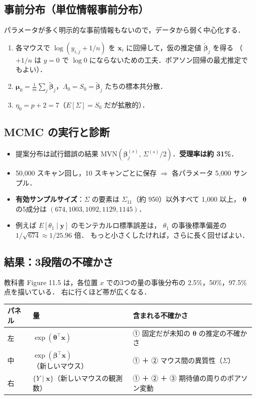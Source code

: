 \documentclass[lualatex,ja=standard,a4paper,12pt]{bxjsarticle}
\newcommand{\mvn}{\mathrm{MVN}}
\begin{document}
\subsection{事前分布（単位情報事前分布）}

パラメータが多く明示的な事前情報もないので，データから弱く中心化する．
\begin{enumerate}
  \item 各マウスで $\log(y_{i,j} + 1/n)$ を $\bm{x}_i$ に回帰して，仮の推定値 $\tilde{\bm{\beta}}_j$ を得る
        （$+1/n$ は $y = 0$ で $\log 0$ にならないための工夫．ポアソン回帰の最尤推定でもよい）．
  \item $\bm{\mu}_0 = \frac{1}{m}\sum_j \tilde{\bm{\beta}}_j$，$\Lambda_0 = S_0 = \tilde{\bm{\beta}}_j$ たちの標本共分散．
  \item $\eta_0 = p + 2 = 7$（$E[\Sigma] = S_0$ だが拡散的）．
\end{enumerate}

\subsection{MCMC の実行と診断}

\begin{itemize}
  \item 提案分布は試行錯誤の結果 $\mvn(\bm{\beta}_j^{(s)},\, \Sigma^{(s)}/2)$．\textbf{受理率は約 31\%}．
  \item 50,000 スキャン回し，10 スキャンごとに保存 $\Rightarrow$ 各パラメータ 5,000 サンプル．
  \item \textbf{有効サンプルサイズ}：$\Sigma$ の要素は $\Sigma_{11}$（約 950）以外すべて 1,000 以上，
        $\bm{\theta}$ の5成分は $(674, 1003, 1092, 1129, 1145)$．
  \item 例えば $E[\theta_1 \mid \bm{y}]$ のモンテカルロ標準誤差は，
        $\theta_1$ の事後標準偏差の $1/\sqrt{674} \approx 1/25.96$ 倍．
        もっと小さくしたければ，さらに長く回せばよい．
\end{itemize}

\subsection{結果：3段階の不確かさ}

教科書 Figure 11.5 は，各位置 $x$ での3つの量の事後分布の 2.5\%，50\%，97.5\% 点を描いている．
右に行くほど帯が広くなる．

\begin{center}
\renewcommand{\arraystretch}{1.6}
\begin{tabular}{llp{6.2cm}}
\toprule
パネル & 量 & 含まれる不確かさ \\
\midrule
左 & $\exp(\bm{\theta}^\top \bm{x})$ & ① 固定だが未知の $\bm{\theta}$ の推定の不確かさ \\
中 & $\exp(\bm{\beta}^\top \bm{x})$（新しいマウス） & ① ＋ ② マウス間の異質性（$\Sigma$） \\
右 & $\{Y \mid \bm{x}\}$（新しいマウスの観測数） & ① ＋ ② ＋ ③ 期待値の周りのポアソン変動 \\
\bottomrule
\end{tabular}
\end{center}
\end{document}
